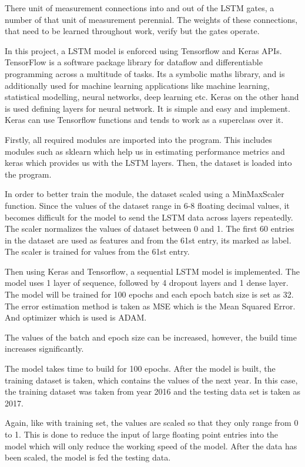 \documentclass[BTech]{srmuthesis}
\begin{document}
There unit of measurement connections into and out of the LSTM gates, a number of that unit of measurement perennial. The weights of these connections, that need to be learned throughout work, verify but the gates operate. 

In this project, a LSTM model is enforced using Tensorflow and Keras APIs. TensorFlow is a software package library for dataflow and differentiable programming across a multitude of tasks. It\textquotesingle s a symbolic maths library, and is additionally used for machine learning applications like machine learning, statistical modelling, neural networks, deep learning etc. Keras on the other hand is used defining layers for neural network. It is simple and easy and implement. Keras can use Tensorflow functions and tends to work as a superclass over it.

Firstly, all required modules are imported into the program. This includes modules such as sklearn which help us in estimating performance metrics and keras which provides us with the LSTM layers. Then, the dataset is loaded into the program. 

In order to better train the module, the dataset scaled using a MinMaxScaler function. Since the values of the dataset range in 6-8 floating decimal values, it becomes difficult for the model to send the LSTM data across layers repeatedly. The scaler normalizes the values of dataset between 0 and 1. The first 60 entries in the dataset are used as features and from the 61st entry, it\textquotesingle s marked as label. The scaler is trained for values from the 61st entry.  

Then using Keras and Tensorflow, a sequential LSTM model is implemented. 
The model uses 1 layer of sequence, followed by 4 dropout layers and 1 dense layer. 
The model will be trained for 100 epochs and each epoch batch size is set as 32. The error estimation method is taken as MSE which is the Mean Squared Error. And optimizer which is used is ADAM.

The values of the batch and epoch size can be increased, however, the build time increases significantly.

The model takes time to build for 100 epochs. After the model is built, the training dataset is taken, which contains the values of the next year. In this case, the training dataset was taken from year 2016 and the testing data set is taken as 2017. 

Again, like with training set, the values are scaled so that they only range from 0 to 1. This is done to reduce the input of large floating point entries into the model which will only reduce the working speed of the model. After the data has been scaled, the model is fed the testing data. 
\end{document}

